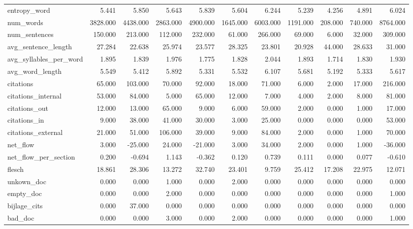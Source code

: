 \begin{tabular}{lrrrrrrrrrr}
\cline{1-11}
entropy\_word & 5.441 & 5.850 & 5.643 & 5.839 & 5.604 & 6.244 & 5.239 & 4.256 & 4.891 & 6.024 \\
\cline{1-11}
num\_words & 3828.000 & 4438.000 & 2863.000 & 4900.000 & 1645.000 & 6003.000 & 1191.000 & 208.000 & 740.000 & 8764.000 \\
\cline{1-11}
num\_sentences & 150.000 & 213.000 & 112.000 & 232.000 & 61.000 & 266.000 & 69.000 & 6.000 & 32.000 & 309.000 \\
\cline{1-11}
avg\_sentence\_length & 27.284 & 22.638 & 25.974 & 23.577 & 28.325 & 23.801 & 20.928 & 44.000 & 28.633 & 31.000 \\
\cline{1-11}
avg\_syllables\_per\_word & 1.895 & 1.839 & 1.976 & 1.775 & 1.828 & 2.044 & 1.893 & 1.714 & 1.830 & 1.930 \\
\cline{1-11}
avg\_word\_length & 5.549 & 5.412 & 5.892 & 5.331 & 5.532 & 6.107 & 5.681 & 5.192 & 5.333 & 5.617 \\
\cline{1-11}
citations & 65.000 & 103.000 & 70.000 & 92.000 & 18.000 & 71.000 & 6.000 & 2.000 & 17.000 & 216.000 \\
\cline{1-11}
citations\_internal & 53.000 & 84.000 & 5.000 & 65.000 & 12.000 & 7.000 & 4.000 & 2.000 & 8.000 & 81.000 \\
\cline{1-11}
citations\_out & 12.000 & 13.000 & 65.000 & 9.000 & 6.000 & 59.000 & 2.000 & 0.000 & 1.000 & 17.000 \\
\cline{1-11}
citations\_in & 9.000 & 38.000 & 41.000 & 30.000 & 3.000 & 25.000 & 0.000 & 0.000 & 0.000 & 53.000 \\
\cline{1-11}
citations\_external & 21.000 & 51.000 & 106.000 & 39.000 & 9.000 & 84.000 & 2.000 & 0.000 & 1.000 & 70.000 \\
\cline{1-11}
net\_flow & 3.000 & -25.000 & 24.000 & -21.000 & 3.000 & 34.000 & 2.000 & 0.000 & 1.000 & -36.000 \\
\cline{1-11}
net\_flow\_per\_section & 0.200 & -0.694 & 1.143 & -0.362 & 0.120 & 0.739 & 0.111 & 0.000 & 0.077 & -0.610 \\
\cline{1-11}
flesch & 18.861 & 28.306 & 13.272 & 32.740 & 23.401 & 9.759 & 25.412 & 17.208 & 22.975 & 12.071 \\
\cline{1-11}
unkown\_doc & 0.000 & 0.000 & 1.000 & 0.000 & 2.000 & 0.000 & 0.000 & 0.000 & 0.000 & 0.000 \\
\cline{1-11}
empty\_doc & 0.000 & 0.000 & 2.000 & 0.000 & 0.000 & 0.000 & 0.000 & 0.000 & 0.000 & 1.000 \\
\cline{1-11}
bijlage\_cits & 0.000 & 37.000 & 0.000 & 0.000 & 0.000 & 0.000 & 0.000 & 0.000 & 0.000 & 0.000 \\
\cline{1-11}
bad\_doc & 0.000 & 0.000 & 3.000 & 0.000 & 2.000 & 0.000 & 0.000 & 0.000 & 0.000 & 1.000 \\
\cline{1-11}
\bottomrule
\end{tabular}
